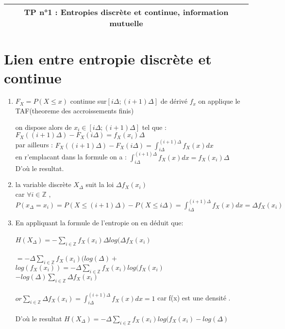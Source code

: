 \documentclass[a4paper]{article}
\begin{document}
\begin{center}
  \begin{tabular}{|c|}
    \hline
    TP n°1 : Entropies discrète et continue, information mutuelle\\
    \hline
  \end{tabular} 
\end{center}
\section{Lien entre entropie discrète et continue}
  \begin{enumerate}
  \item  $F_{X}=P(X\leq x)$ continue sur$ [i\Delta ; (i+1)\Delta] $ de dérivé $f_{x}  $  on applique le TAF(theoreme des accroissements finis)

    on dispose alors de $x_{i} \in [i\Delta ; (i+1)\Delta]$ tel que :
    $ F_{X}((i+1)\Delta)-F_{X}(i\Delta)=f_{X}(x_{i})\Delta$\\
    par ailleurs :  $ F_{X}((i+1)\Delta)-F_{X}(i\Delta) =  \int_{i\Delta}^{(i+1)\Delta}f_{X}(x)dx$\\
    en r'emplacant dans la formule on a : $ \int_{i\Delta}^{(i+1)\Delta}f_{X}(x)dx = f_{X}(x_{i})\Delta$ \\
  D'où le resultat.\\
    
    
  \item la variable discrète $X_{\Delta}$ suit la  loi $\Delta f_{X}(x_{i})$\\ car $\forall i \in \mathbb{Z}$  , $ P(x_{\Delta} = x_{i}) = P(X\leq (i+1)\Delta) - P(X \leq i\Delta)= \int_{i\Delta}^{(i+1)\Delta}f_{X}(x)dx = \Delta f_{X}(x_{i}) $\\


  \item  En appliquant la formule de l'entropie on en déduit que:\\ \\ $H(X_{\Delta}) =- \sum_{i \in \mathbb{Z}}f_{X}(x_{i})\Delta log(\Delta f_{X}(x_{i})$ \\ \\$ = -\Delta \sum_{i \in \mathbb{Z}}f_{X}(x_{i})(log(\Delta) +$  $ log(f_{X}(x_{i})) = -\Delta \sum_{i \in \mathbb{Z}}f_{X}(x_{i})log(f_{X}(x_{i})$  $ - log(\Delta)\sum_{i \in \mathbb{Z}}\Delta f_{X}(x_{i})$\\ \\ $ or   \sum_{i \in \mathbb{Z}} \Delta f_{X}(x_{i}) = \int_{i\Delta}^{(i+1)\Delta}f_{X}(x)dx= 1 $ car f(x) est une densité . \\ \\
D'où le resultat  $H(X_{\Delta}) = -\Delta \sum_{i \in \mathbb{Z}}f_{X}(x_{i})log(f_{X}(x_{i}) - log(\Delta)$\\






\end{enumerate}
\end{document}
